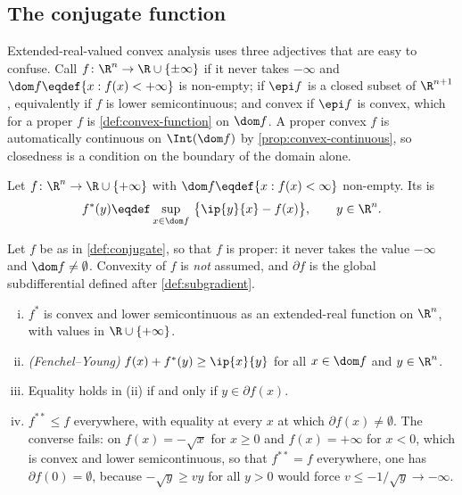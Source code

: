 \subsection{The conjugate function}\label{subsec:cvx-conjugate}

Extended-real-valued convex analysis uses three adjectives that are easy to
confuse. Call $f\colon\R^n\to\R\cup\{\pm\infty\}$ 
if it never takes $-\infty$ and $\dom f\eqdef\{x : f(x)<+\infty\}$ is non-empty;
 if $\epi f$ is a closed subset of
$\R^{n+1}$, equivalently if $f$ is lower semicontinuous; and convex if $\epi f$
is convex, which for a proper $f$ is \autoref{def:convex-function} on $\dom f$.
A proper convex $f$ is automatically continuous on $\Int(\dom f)$ by
\autoref{prop:convex-continuous}, so closedness is a condition on the boundary
of the domain alone.

\begin{definition}\label{def:conjugate}
	Let $f\colon\R^n\to\R\cup\{+\infty\}$ with $\dom f\eqdef\{x : f(x)<\infty\}$
	non-empty. Its  is
	\begin{equation}\label{eq:conjugate}
		f^{\ast}(y)\eqdef\sup_{x\in\dom f}\ \bigl\{\ip{y}{x}-f(x)\bigr\},
		\qquad y\in\R^n .
	\end{equation}
\end{definition}

\begin{proposition}\label{prop:conjugate-properties}
	Let $f$ be as in \autoref{def:conjugate}, so that $f$ is proper: it never
	takes the value $-\infty$ and $\dom f\neq\emptyset$. Convexity of $f$ is
	\emph{not} assumed, and $\partial f$ is the global subdifferential defined
	after \autoref{def:subgradient}.
	\begin{enumerate}[(i)]
		\item $f^{\ast}$ is convex and lower semicontinuous as an extended-real
		      function on $\R^n$, with values in $\R\cup\{+\infty\}$.
		\item \emph{(Fenchel--Young)} $f(x)+f^{\ast}(y)\geq\ip{x}{y}$ for all
		      $x\in\dom f$ and $y\in\R^n$.
		\item Equality holds in (ii) if and only if $y\in\partial f(x)$.
		\item $f^{\ast\ast}\leq f$ everywhere, with equality at every $x$ at which
		      $\partial f(x)\neq\emptyset$. The converse fails: on
		      $f(x)=-\sqrt{x}$ for $x\geq0$ and $f(x)=+\infty$ for $x<0$, which is
		      convex and lower semicontinuous, so that $f^{\ast\ast}=f$ everywhere,
		      one has $\partial f(0)=\emptyset$, because $-\sqrt y\geq vy$ for all
		      $y>0$ would force $v\leq-1/\sqrt y\to-\infty$.
	\end{enumerate}
\end{proposition}

